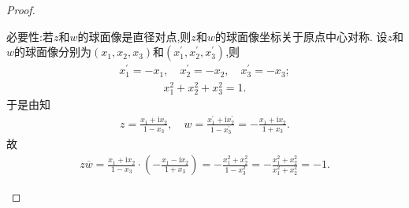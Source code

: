 \documentclass[../../main.tex]{subfiles}%
\begin{document}
\begin{proof}
\begin{enumerate}[(1)]
{\heiti 必要性:}若$z$和$w$的球面像是直径对点,则$z$和$w$的球面像坐标关于原点中心对称.
设$z$和$w$的球面像分别为$\left( x_1,x_2,x_3 \right)$和$\left( x_{1}^{\prime},x_{2}^{\prime},x_{3}^{\prime} \right)$,则
\begin{align*}
x_{1}^{\prime}=-x_1,\quad x_{2}^{\prime}=-x_2,\quad x_{3}^{\prime}=-x_3;
\end{align*}
\begin{align*}
x_{1}^{2}+x_{2}^{2}+x_{3}^{2}=1.
\end{align*}
于是由知
\begin{align*}
z=\frac{x_1+\mathrm{i}x_2}{1-x_3},\quad w=\frac{x_{1}^{\prime}+\mathrm{i}x_{2}^{\prime}}{1-x_{3}^{\prime}}=-\frac{x_1+\mathrm{i}x_2}{1+x_3}.
\end{align*}
故
\begin{align*}
z\overline{w}=\frac{x_1+\mathrm{i}x_2}{1-x_3}\cdot \left( -\frac{x_1-\mathrm{i}x_2}{1+x_3} \right) =-\frac{x_{1}^{2}+x_{2}^{2}}{1-x_{3}^{2}}=-\frac{x_{1}^{2}+x_{2}^{2}}{x_{1}^{2}+x_{2}^{2}}=-1.
\end{align*}


\end{enumerate}
\end{proof}
\end{document}

